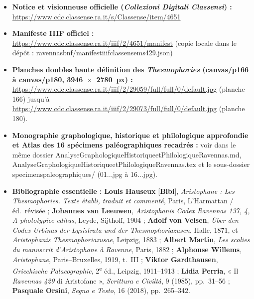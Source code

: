 \documentclass[10pt, a4paper, twoside]{book}
\renewcommand{\_}{\origunderscore\penalty0\relax}
\renewcommand{\texttt}[1]{#1}
\providecommand{\italique}[1]{\emph{#1}}
\providecommand{\ieme}{\textsuperscript{e}}
\begin{document}
\begin{itemize}
  \item \textbf{Notice et visionneuse officielle (\italique{Collezioni Digitali Classensi}) :} \url{https://www.cdc.classense.ra.it/s/Classense/item/4651}
  \item \textbf{Manifeste IIIF officiel :} \url{https://www.cdc.classense.ra.it/iiif/2/4651/manifest} (copie locale dans le dépôt : \texttt{ravennas\_1904\_bnf/\allowbreak manifest\_iiif\_classense\_ms429.json})
  \item \textbf{Planches doubles haute définition des \italique{Thesmophories} (\texttt{canvas/p166} à \texttt{canvas/p180}, 3946~$\times$~2780~px) :} \url{https://www.cdc.classense.ra.it/iiif/2/29059/full/full/0/default.jpg} (planche 166) jusqu'à \url{https://www.cdc.classense.ra.it/iiif/2/29073/full/full/0/default.jpg} (planche 180).
  \item \textbf{Monographie graphologique, historique et philologique approfondie et Atlas des 16 spécimens paléographiques recadrés :} voir dans le même dossier \texttt{Analyse\_\allowbreak Graphologique\_\allowbreak Historique\_\allowbreak et\_\allowbreak Philologique\_\allowbreak Ravennas.md}, \texttt{Analyse\_\allowbreak Graphologique\_\allowbreak Historique\_\allowbreak et\_\allowbreak Philologique\_\allowbreak Ravennas.tex} et le sous-dossier \texttt{specimens\_\allowbreak paleographiques/} (\texttt{01\_...jpg} à \texttt{16\_...jpg}).
  \item \textbf{Bibliographie essentielle :} \textbf{Louis Hauseux} [\textbf{Bibi}], \italique{Aristophane : Les Thesmophories. Texte établi, traduit et commenté}, Paris, L'Harmattan / éd.~révisée ; \textbf{Johannes van Leeuwen}, \italique{Aristophanis Codex Ravennas 137, 4, A phototypice editus}, Leyde, Sijthoff, 1904 ; \textbf{Adolf von Velsen}, \italique{Über den Codex Urbinas der Lysistrata und der Thesmophoriazusen}, Halle, 1871, et \italique{Aristophanis Thesmophoriazusae}, Leipzig, 1883 ; \textbf{Albert Martin}, \italique{Les scolies du manuscrit d'Aristophane à Ravenne}, Paris, 1882 ; \textbf{Alphonse Willems}, \italique{Aristophane}, Paris--Bruxelles, 1919, t.~III ; \textbf{Viktor Gardthausen}, \italique{Griechische Palaeographie}, 2\ieme{} éd., Leipzig, 1911--1913 ; \textbf{Lidia Perria}, « Il \italique{Ravennas 429} di Aristofane », \italique{Scrittura e Civiltà}, 9 (1985), pp.~31--56 ; \textbf{Pasquale Orsini}, \italique{Segno e Testo}, 16 (2018), pp.~265--342.
\end{itemize}
\end{document}
